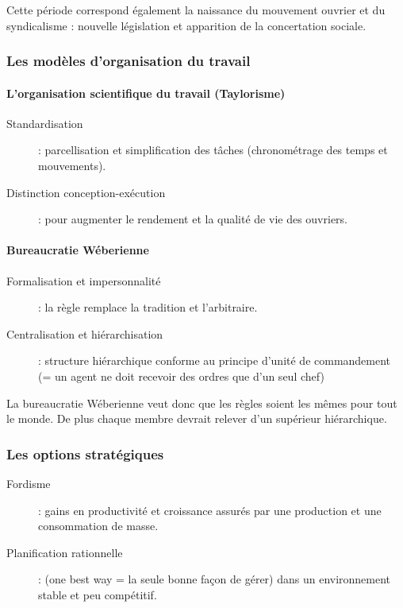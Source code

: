\documentclass[12pt]{article}
\begin{document}
	  Cette période correspond également la naissance du mouvement ouvrier et du syndicalisme : nouvelle législation et apparition de la concertation sociale.

	  \subsubsection{Les modèles d'organisation du travail}
	  
	  \paragraph{L'organisation scientifique du travail (Taylorisme)}
	  \begin{description}
	   \item[Standardisation] : parcellisation et simplification des tâches (chronométrage des temps et mouvements).
	   \item[Distinction conception-exécution] : pour augmenter le rendement et la qualité de vie des ouvriers.
	  \end{description}
	  
	  \paragraph{Bureaucratie Wéberienne}
	  \begin{description}
	   \item[Formalisation et impersonnalité] : la règle remplace la tradition et l'arbitraire.
	   \item[Centralisation et hiérarchisation] : structure hiérarchique conforme au principe d'unité de commandement (= un agent ne doit recevoir des ordres que d'un seul chef) \newline
	  \end{description}
	  
		La bureaucratie Wéberienne veut donc que les règles soient les mêmes pour tout le monde. De plus chaque membre devrait relever d'un supérieur hiérarchique.
	  
	  \subsubsection{Les options stratégiques}
	  \begin{description}
	   \item[Fordisme] : gains en productivité et croissance assurés par une production et une consommation de masse.
	   \item[Planification rationnelle] : (one best way = la seule bonne façon de gérer) dans un environnement stable et peu compétitif. 
	  \end{description}
\end{document}
